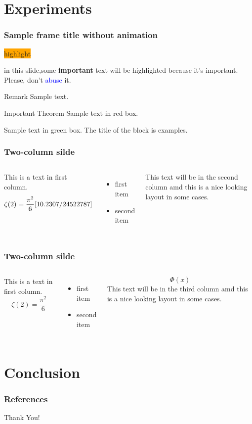 \documentclass{beamer}
\begin{document}
\section{Experiments}
\begin{frame}
    \frametitle{Sample frame title without animation}
    \colorbox{orange}{highlight}

    in this slide,some \textbf{important} text will be \alert{highlighted} because
    it's important. Please, don't \textcolor{blue}{abuse} it.
    \begin{block}{Remark}
        Sample text.
    \end{block}
    \begin{alertblock}{Important Theorem}
        Sample text in red box.
    \end{alertblock}
    \begin{examples}
        Sample text in green box. The title of the block is examples.
    \end{examples}
\end{frame}
\begin{frame}
    \frametitle{Two-column silde}
    \begin{columns}
        This is a text in first column.
        \begin{equation*}
            \zeta (2) =\frac{\pi^2}{6}\cite{10.2307/24522787}
        \end{equation*}
        \begin{itemize}
            \item first item
            \item second item
        \end{itemize}
        This text will be in the second column amd this is a nice looking layout in some cases.

    \end{columns}
\end{frame}
\begin{frame}
    \frametitle{Two-column silde}
    \begin{columns}
        This is a text in first column.
        \begin{equation*}
            \zeta (2) =\frac{\pi^2}{6}
        \end{equation*}
        \begin{itemize}
            \item first item
            \item second item
        \end{itemize}
        \begin{equation*}
            \varPhi (x)
        \end{equation*}
        This text will be in the third column amd this is a nice looking layout in some cases.
    \end{columns}
\end{frame}

\section{Conclusion}
\begin{frame}
    \frametitle{References}
    
    
\end{frame}

\begin{frame}
    \Huge{\centerline{Thank You!}}
\end{frame}
\end{document}
